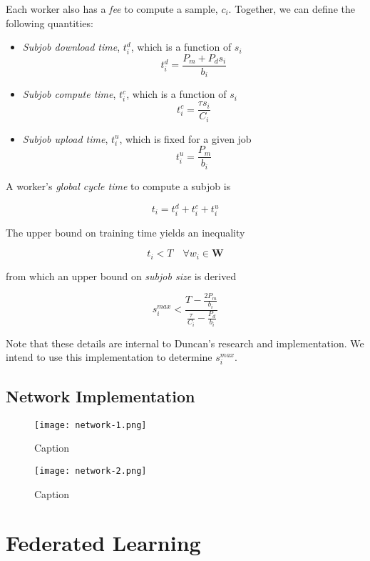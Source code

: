 \documentclass[../mthe-493-final-project.tex]{subfiles}
\begin{document}
    Each worker also has a \textit{fee} to compute a sample, $c_i$. Together, we can define the following quantities:

    \begin{itemize}
        \item \textit{Subjob download time}, $t^d_i$, which is a function of $s_i$
              \[t^d_i = \frac{P_m + P_d s_i}{b_i}\]
        \item \textit{Subjob compute time}, $t^c_i$, which is a function of $s_i$
              \[t^c_i = \frac{\tau s_i}{C_i}\]
        \item \textit{Subjob upload time}, $t^u_i$, which is fixed for a given job
              \[t^u_i = \frac{P_m}{b_i}\]
    \end{itemize}

    A worker's \textit{global cycle time} to compute a subjob is

    \[t_i = t^d_i + t^c_i + t^u_i\]

    The upper bound on training time yields an inequality

    \[t_i < T \quad \forall w_i \in \mathbf{W}\]

    from which an upper bound on \textit{subjob size} is derived

    \[s^{max}_i < \frac{T - \frac{2 P_m}{b_i}}{\frac{\tau}{C_i} - \frac{P_d}{b_i}}\]

    Note that these details are internal to Duncan's research and implementation. We intend to use this implementation to determine $s^{max}_i$.

    \subsection{Network Implementation}
    \label{ssec:network-implementation}

    \begin{figure}
        \centering
        \texttt{[image: network-1.png]}
        \caption{Caption}
        \label{fig:network-flowchart}
    \end{figure}

    \begin{figure}
        \centering
        \texttt{[image: network-2.png]}
        \caption{Caption}
        \label{fig:network-sequence}
    \end{figure}

    \section{Federated Learning}
    \label{sec:federate-learning}
\end{document}

